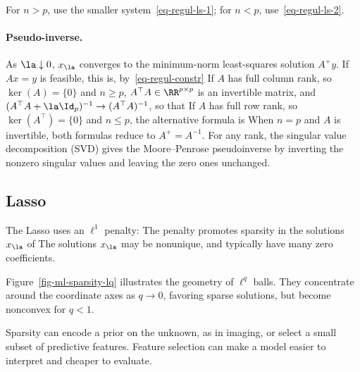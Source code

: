 For $n>p$, use the smaller system~\eqref{eq-regul-ls-1}; for $n<p$, use~\eqref{eq-regul-ls-2}.

    
\paragraph{Pseudo-inverse.}

As $\la\downarrow0$, $x_\la$ converges to the minimum-norm least-squares solution $A^+y$. If $Ax=y$ is feasible, this is, by~\eqref{eq-regul-constr}
If $A$ has full column rank, so $\ker(A)=\{0\}$ and $n\geq p$, $A^\top A \in \RR^{p \times p}$ is an invertible matrix, and $(A^\top A + \la \Id_p)^{-1} \rightarrow (A^\top A)^{-1}$, so that
If $A$ has full row rank, so $\ker(A^\top)=\{0\}$ and $n\leq p$, the alternative formula is
When $n=p$ and $A$ is invertible, both formulas reduce to $A^+=A^{-1}$. For any rank, the singular value decomposition (SVD) gives the Moore--Penrose pseudoinverse by inverting the nonzero singular values and leaving the zero ones unchanged.



                                                                        
\subsection{Lasso}

The Lasso uses an $\ell^1$ penalty:
The penalty promotes sparsity in the solutions $x_\la$ of
The solutions $x_\la$ may be nonunique, and typically have many zero coefficients.
 
Figure~\ref{fig-ml-sparsity-lq} illustrates the geometry of $\ell^q$ balls. They concentrate around the coordinate axes as $q \rightarrow 0$, favoring sparse solutions, but become nonconvex for $q<1$.


Sparsity can encode a prior on the unknown, as in imaging, or select a small subset of predictive features. Feature selection can make a model easier to interpret and cheaper to evaluate.
 
